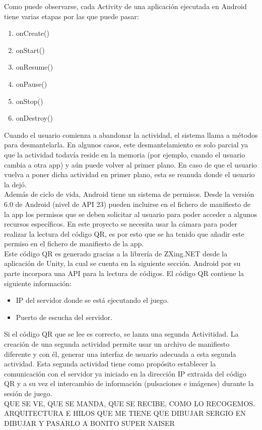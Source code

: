 Como puede observarse, cada Activity de una aplicaci\'on ejecutada en Android tiene varias etapas por las que puede pasar:

\begin{enumerate}
\item onCreate()
\item onStart()
\item onResume()
\item onPause()
\item onStop()
\item onDestroy()
\end {enumerate}

Cuando el usuario comienza a abandonar la actividad, el sistema llama a m\'etodos para desmantelarla. En algunos casos, este desmantelamiento es solo parcial ya que la actividad todav\'ia reside en la memoria (por ejemplo, cuando el usuario cambia a otra app) y a\'un puede volver al primer plano. En caso de que el usuario vuelva a poner dicha actividad en primer plano, esta se reanuda donde el usuario la dej\'o.
\\
Adem\'as de ciclo de vida, Android tiene un sistema de permisos. Desde la versi\'on 6.0 de Android (nivel de API 23) pueden incluirse en el fichero de manifiesto de la app los permisos que se deben solicitar al usuario para poder acceder a algunos recursos espec\'ificos. En este proyecto se necesita usar la c\'amara para poder realizar la lectura del c\'odigo QR, es por esto que se ha tenido que a\~nadir este permiso en el fichero de manifiesto de la app.
\\
Este c\'odigo QR es generado gracias a la librer\'ia de ZXing.NET desde la aplicaci\'on de Unity, la cual se cuenta en la siguiente secci\'on. Android por su parte incorpora una API para la lectura de c\'odigos. El c\'odigo QR contiene la siguiente informaci\'on:

\begin{itemize}
\item IP del servidor donde se est\'a ejecutando el juego.
\item Puerto de escucha del servidor.
\end {itemize}

Si el c\'odigo QR que se lee es correcto, se lanza una segunda Activitidad. La creaci\'on de una segunda actividad permite usar un archivo de manifiesto diferente y con \'el, generar una interfaz de usuario adecuada a esta segunda actividad. Esta segunda actividad tiene como prop\'osito establecer la comunicaci\'on con el servidor ya iniciado en la direcci\'on IP extraida del c\'odigo QR y a su vez el intercambio de informaci\'on (pulsaciones e im\'agenes) durante la sesi\'on de juego.
\\
QUE SE VE, QUE SE MANDA, QUE SE RECIBE, COMO LO RECOGEMOS. ARQUITECTURA E HILOS QUE ME TIENE QUE DIBUJAR SERGIO EN DIBUJAR Y PASARLO A BONITO SUPER NAISER


